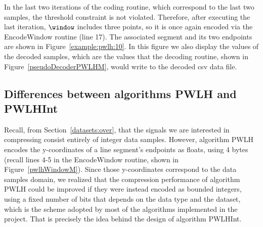 

In the last two iterations of the coding routine, which correspond to the last two samples, the threshold constraint is not violated. Therefore, after executing the last iteration, $\window$ includes three points, so it is once again encoded via the EncodeWindow routine (line 17). The associated segment and its two endpoints are shown in Figure~\ref{example:pwlh:10}. In this figure we also display the values of the decoded samples, which are the values that the decoding routine, shown in Figure~\ref{pseudoDecoderPWLHM}, would write to the decoded csv data file. 






\clearpage
\subsection{Differences between algorithms PWLH and PWLHInt}
\label{algo:pwhl:int}


Recall, from Section~\ref{datasets:over}, that the signals we are interested in compressing consist entirely of integer data samples. However, algorithm PWLH encodes the y-coordinates of a line segment's endpoints as floats, using 4 bytes (recall lines 4-5 in the EncodeWindow routine, shown in Figure~\ref{pwlhWindowM}). Since those y-coordinates correspond to the data samples domain, we realized that the compression performance of algorithm PWLH could be improved if they were instead encoded as bounded integers, using a fixed number of bits that depends on the data type and the dataset, which is the scheme adopted by most of the algorithms implemented in the project. That is precisely the idea behind the design of algorithm PWLHInt.


